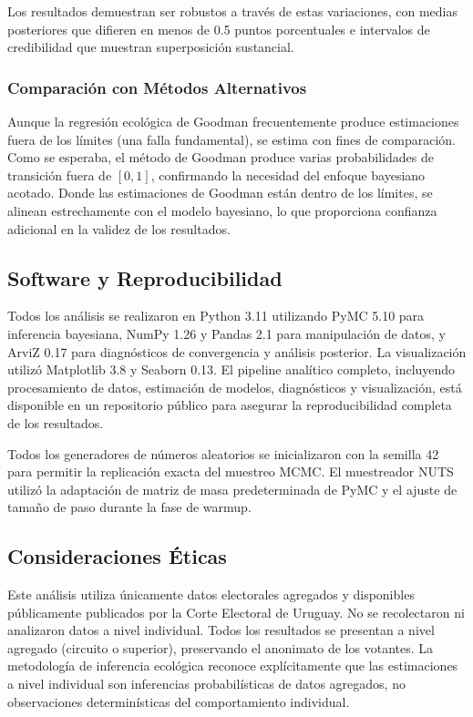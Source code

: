 Los resultados demuestran ser robustos a través de estas variaciones, con medias posteriores que difieren en menos de 0.5 puntos porcentuales e intervalos de credibilidad que muestran superposición sustancial.

\subsubsection{Comparación con Métodos Alternativos}

Aunque la regresión ecológica de Goodman frecuentemente produce estimaciones fuera de los límites (una falla fundamental), se estima con fines de comparación. Como se esperaba, el método de Goodman produce varias probabilidades de transición fuera de $[0,1]$, confirmando la necesidad del enfoque bayesiano acotado. Donde las estimaciones de Goodman están dentro de los límites, se alinean estrechamente con el modelo bayesiano, lo que proporciona confianza adicional en la validez de los resultados.

\subsection{Software y Reproducibilidad}

Todos los análisis se realizaron en Python 3.11 utilizando PyMC 5.10 \cite{abril2023pymc} para inferencia bayesiana, NumPy 1.26 y Pandas 2.1 para manipulación de datos, y ArviZ 0.17 para diagnósticos de convergencia y análisis posterior. La visualización utilizó Matplotlib 3.8 y Seaborn 0.13. El pipeline analítico completo, incluyendo procesamiento de datos, estimación de modelos, diagnósticos y visualización, está disponible en un repositorio público para asegurar la reproducibilidad completa de los resultados.

Todos los generadores de números aleatorios se inicializaron con la semilla 42 para permitir la replicación exacta del muestreo MCMC. El muestreador NUTS utilizó la adaptación de matriz de masa predeterminada de PyMC y el ajuste de tamaño de paso durante la fase de warmup.

\subsection{Consideraciones Éticas}

Este análisis utiliza únicamente datos electorales agregados y disponibles públicamente publicados por la Corte Electoral de Uruguay. No se recolectaron ni analizaron datos a nivel individual. Todos los resultados se presentan a nivel agregado (circuito o superior), preservando el anonimato de los votantes. La metodología de inferencia ecológica reconoce explícitamente que las estimaciones a nivel individual son inferencias probabilísticas de datos agregados, no observaciones determinísticas del comportamiento individual.
